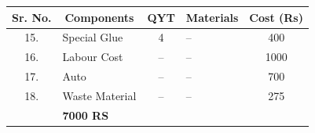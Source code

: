 \vspace*{10mm}
\begin{center}
\renewcommand{\arraystretch}{1.35}
\begin{tabular}{|c|p{45mm}|c|p{35mm}|c|}
\hline
\rowcolor{gray!20}
\textbf{Sr. No.} & \multicolumn{1}{c|}{\textbf{Components}} & \textbf{QYT} & \multicolumn{1}{c|}{\textbf{Materials}} & \textbf{Cost (Rs)} \\
\hline
15. & Special Glue & 4 & -- & 400 \\
\hline
16. & Labour Cost & -- & -- & 1000 \\
\hline
17. & Auto & -- & -- & 700 \\
\hline
18. & Waste Material & -- & -- & 275 \\
\hline
\rowcolor{gray!15}
\multicolumn{4}{|r|}{\textbf{TOTAL}} & \textbf{7000 RS} \\
\hline
\end{tabular}
\end{center}
\clearpage
